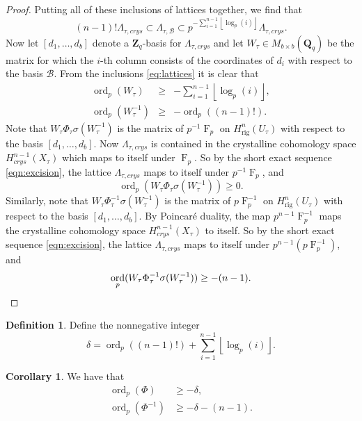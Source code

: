 \documentclass[a4paper,11pt]{article}
\numberwithin{equation}{section}
\providecommand{\floor}[1]{\left\lfloor#1\right\rfloor}   %
\newcommand{\ZZ}{\mathbf{Z}} %
\newcommand{\QQ}{\mathbf{Q}} %
\DeclareMathOperator{\ord}{ord}          %
\DeclareMathOperator{\Frob}{F}           %
\providecommand{\Hrig}{H_{\text{rig}}}  %
\providecommand{\cB}{\mathcal{B}} %
\theoremstyle{definition}
\newtheorem{cor}[thm]{Corollary}
\newtheorem{defn}[thm]{Definition}
\begin{document}
\begin{proof}
Putting all of these inclusions of lattices together, we find that
\begin{equation} \label{eq:lattices}
(n-1)! \Lambda_{\tau,crys} \subset \Lambda_{\tau,\cB} \subset p^{-\sum_{i=1}^{n-1} \floor{\log_p(i)}} \Lambda_{\tau,crys}.
\end{equation}
Now let $[d_1, \ldots, d_b]$ denote a $\ZZ_q$-basis for $\Lambda_{\tau,crys}$ and let $W_{\tau} \in M_{b \times b}(\QQ_q)$ be the matrix
for which the $i$-th column consists of the coordinates of $d_i$ with respect to the basis $\cB$. From the inclusions \eqref{eq:lattices}
it is clear that 
\begin{eqnarray*}
\ord_p(W_{\tau}) &\geq& -\sum_{i=1}^{n-1} \floor{\log_p(i)}, \\
\ord_p(W_{\tau}^{-1}) &\geq& -\ord_p((n-1)!).
\end{eqnarray*}
Note that $W_{\tau} \Phi_{\tau} \sigma(W_{\tau}^{-1})$ is the matrix of $p^{-1}\Frob_{p}$ on $\Hrig^n(U_{\tau})$
with respect to the basis $[d_1,\ldots,d_b]$. Now $\Lambda_{\tau,crys}$ is contained in the crystalline cohomology 
space $H^{n-1}_{crys}(X_{\tau})$ which maps to itself under $\Frob_p$. So by the short exact sequence 
\eqref{eqn:excision}, the lattice $\Lambda_{\tau,crys}$ maps to itself under $p^{-1}\Frob_{p}$, and
\[
\ord_p(W_{\tau} \Phi_{\tau} \sigma(W_{\tau}^{-1})) \geq 0.
\]
Similarly, note that $W_{\tau} \Phi_{\tau}^{-1} \sigma(W_{\tau}^{-1})$ is the matrix of $p\Frob_p^{-1}$ on 
$\Hrig^n(U_{\tau})$ with respect to the basis $[d_1,\ldots,d_b]$. By Poincar\'e duality, 
the map $p^{n-1}\Frob_p^{-1}$ maps the crystalline cohomology space $H^{n-1}_{crys}(X_{\tau})$
to itself. So by the short exact sequence \eqref{eqn:excision}, the lattice $\Lambda_{\tau,crys}$ 
maps to itself under $p^{n-1} (p\Frob_p^{-1})$, and 
\begin{equation*}
\ord_p(W_{\tau} \Phi_{\tau}^{-1} \sigma(W_{\tau}^{-1})) \geq -(n-1). \qedhere
\end{equation*}
\end{proof}

\begin{defn} \label{defn:delta}
Define the nonnegative integer
\[
\delta = \ord_p((n-1)!)+\sum_{i=1}^{n-1} \floor{\log_p(i)}.
\]
\end{defn}

\begin{cor} \label{cor:delta} We have that
\begin{align*}
\ord_p(\Phi) &\geq -\delta, \\
\ord_p(\Phi^{-1}) &\geq -\delta-(n-1).
\end{align*}
\end{cor}
\end{document}
